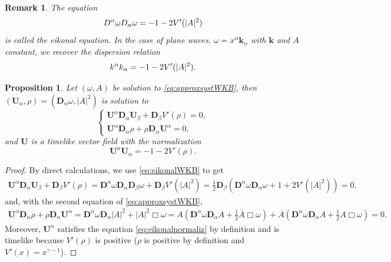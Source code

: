 \documentclass[a4paper, 15pt]{article}
\numberwithin{equation}{section}
\newtheorem{propal}[defi]{Proposition}
\newtheorem{rem}[defi]{Remark}
\begin{document}
\begin{rem}
\label{rem:eikonalWKB}
The equation 
\begin{equation}
    \label{eq:eikonalWKB}
    \textbf{D}^\alpha \omega\textbf{D}_\alpha \omega=-1-2V'(|A|^2)\\
\end{equation}
is called the eikonal equation. In the case of plane waves, $\omega=x^\alpha \textbf{k}_\alpha$ with $\textbf{k}$ and $A$ constant, we recover the dispersion relation 
\begin{equation}
    \label{eq:dispersionWKB}
    \textbf{k}^\alpha \textbf{k}_\alpha=-1-2V'(|A|^2).\\
\end{equation}
\end{rem}

\begin{propal}
    Let $(\omega,A)$ be solution to \eqref{eq:approxsystWKB}, then $(\textbf{U}_\alpha,\rho)=(\textbf{D}_\alpha \omega,|A|^2)$ is solution to 
     \begin{equation}
    \label{eq:approxsysteulerWKB}
\begin{cases}
    \textbf{U}^\alpha\textbf{D}_\alpha \textbf{U}_\beta+\textbf{D}_\beta V'(\rho)=0,\\
    \textbf{U}^\alpha\textbf{D}_\alpha \rho+\rho\textbf{D}_\alpha \textbf{U}^\alpha=0,
    \end{cases}
\end{equation}
and $\textbf{U}$ is a timelike vector field with the normalization 
\begin{equation}
   \label{eq:eikonalnormaliz}
    \textbf{U}^\alpha \textbf{U}_\alpha=-1-2V'(\rho).
\end{equation}
\end{propal}
\begin{proof}
    By direct calculations, we use \eqref{eq:eikonalWKB} to get 
    \begin{align}
          \textbf{U}^\alpha\textbf{D}_\alpha \textbf{U}_\beta+\textbf{D}_\beta V'(\rho)=\textbf{D}^\alpha \omega\textbf{D}_\alpha\textbf{D}_\beta \omega+\textbf{D}_\beta V'(|A|^2)=\frac{1}{2}\textbf{D}_\beta(\textbf{D}^\alpha \omega\textbf{D}_\alpha \omega+1+2V'(|A|^2))=0,
    \end{align}
    and, with the second equation of \eqref{eq:approxsystWKB}, 
     \begin{align}
          \textbf{U}^\alpha\textbf{D}_\alpha \rho+\rho\textbf{D}_\alpha \textbf{U}^\alpha= \textbf{D}^\alpha \omega\textbf{D}_\alpha |A|^2+|A|^2\Box \omega=A(\textbf{D}^\alpha \omega\textbf{D}_\alpha \overline{A}+\frac{1}{2}\overline{A}\Box \omega)+\overline{A}(\textbf{D}^\alpha \omega\textbf{D}_\alpha A+\frac{1}{2}A\Box \omega)=0.
    \end{align}
    Moreover, $\textbf{U}^\alpha$ satisfies the equation \eqref{eq:eikonalnormaliz} by definition and is timelike because $V'(\rho)$ is positive ($\rho$ is positive by definition and $V'(x)=x^{\gamma-1}$).
\end{proof}
\end{document}
